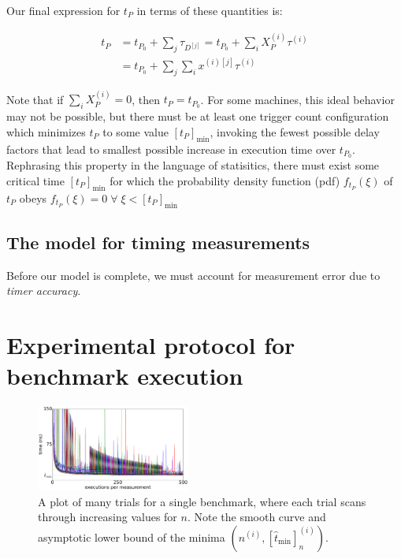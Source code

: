 \documentclass[conference]{IEEEtran}
\begin{document}
Our final expression for $t_P$ in terms of these quantities is:

\begin{align}
t_P &= t_{P_0} + \sum_{j} \tau_{D^{[j]}} = t_{P_0} + \sum_{i} X_P^{(i)} \tau^{(i)} \\
    &= t_{P_0} + \sum_{j} \sum_{i} x^{(i)[j]} \tau^{(i)}
\end{align}


Note that if $\sum_{i} X_P^{(i)} = 0$, then $t_P = t_{P_0}$. For some machines, this ideal
behavior may not be possible, but there must be at least one trigger count configuration
which minimizes $t_P$ to some value $[t_P]_{\textrm{min}}$, invoking the fewest possible
delay factors that lead to smallest possible increase in execution time over $t_{P_0}$.
Rephrasing this property in the language of statisitics, there must exist some critical time
$[t_P]_{\textrm{min}}$ for which the probability density function (pdf) $f_{t_P}(\xi)$ of
$t_P$ obeys $f_{t_P}(\xi) = 0 \; \forall \; \xi < [t_P]_{\textrm{min}}$

\subsection{The model for timing measurements}

Before our model is complete, we must account for measurement error due to \textit{timer
accuracy}.

\label{sec:protocol}
\section{Experimental protocol for benchmark execution}

\begin{figure}
\centering
\includegraphics[width=0.45\textwidth]{figures/fig2/linear_scan_branchsum}
\caption{A plot of many trials for a single benchmark, where each trial scans through
increasing values for $n$. Note the smooth curve and asymptotic lower bound of the minima
$(n^{(i)}, [\hat{t}_{\textrm{min}}]^{(i)}_n)$.}
\label{fig:scaling}
\end{figure}
\end{document}
